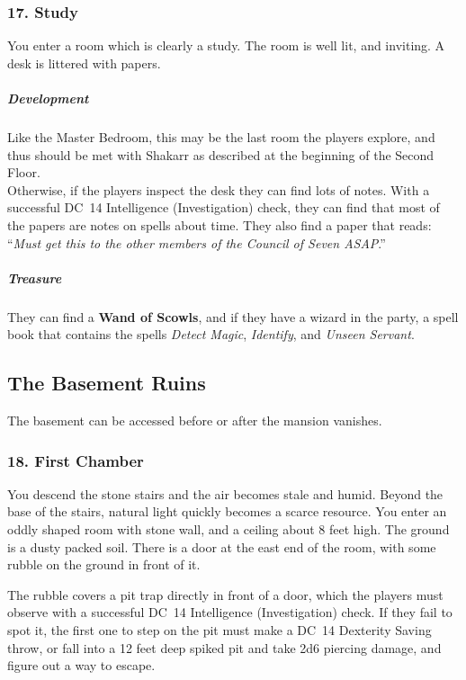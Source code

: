 \subsubsection{17. Study}
\begin{DndReadAloud}
    You enter a room which is clearly a study. The room is well lit, and inviting. A desk is littered with papers.
    \end{DndReadAloud}
    \subparagraph{Development} Like the Master Bedroom, this may be the last room the players explore, and thus should be met with Shakarr as described at the beginning of the Second Floor. \\
    Otherwise, if the players inspect the desk they can find lots of notes. With a successful DC~14 Intelligence (Investigation) check, they can find that most of the papers are notes on spells about time. They also find a paper that reads: ``\textit{Must get this to the other members of the Council of Seven ASAP}.''
    \subparagraph{Treasure}
    They can find a \textbf{Wand of Scowls}, and if they have a wizard in the party, a spell book that contains the spells \textit{Detect Magic}, \textit{Identify}, and \textit{Unseen Servant}.
    
\subsection{The Basement Ruins}
The basement can be accessed before or after the mansion vanishes. 
\subsubsection{18. First Chamber}
\begin{DndReadAloud}
    You descend the stone stairs and the air becomes stale and humid. Beyond the base of the stairs, natural light quickly becomes a scarce resource. You enter an oddly shaped room with stone wall, and a ceiling about 8 feet high. The ground is a dusty packed soil. There is a door at the east end of the room, with some rubble on the ground in front of it.
\end{DndReadAloud}
The rubble covers a pit trap directly in front of a door, which the players must observe with a successful DC~14 Intelligence (Investigation) check. If they fail to spot it, the first one to step on the pit must make a DC~14 Dexterity Saving throw, or fall into a 12 feet deep spiked pit and take 2d6 piercing damage, and figure out a way to escape.
